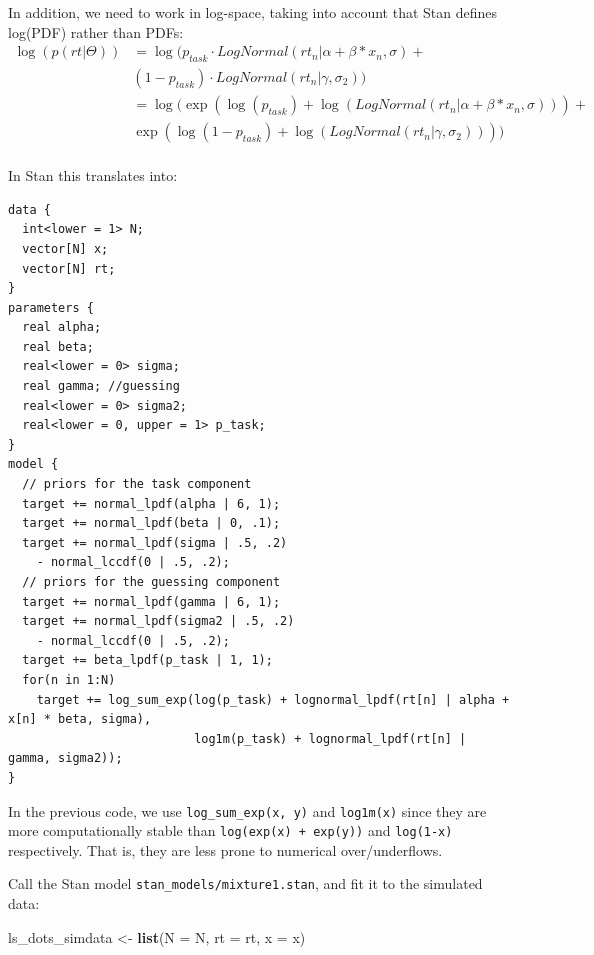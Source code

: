 \documentclass[12pt,]{krantz}
\newenvironment{Shaded}{\begin{snugshade}}{\end{snugshade}}
\newcommand{\DataTypeTok}[1]{\textcolor[rgb]{0.13,0.29,0.53}{#1}}
\newcommand{\KeywordTok}[1]{\textcolor[rgb]{0.13,0.29,0.53}{\textbf{#1}}}
\newcommand{\NormalTok}[1]{#1}
\newcommand{\StringTok}[1]{\textcolor[rgb]{0.31,0.60,0.02}{#1}}
\theoremstyle{definition}
\theoremstyle{definition}
\theoremstyle{definition}
\theoremstyle{remark}
\begin{document}
In addition, we need to work in log-space, taking into account that Stan defines log(PDF) rather than PDFs:
\begin{equation}
\begin{aligned}
\log(p(rt | \Theta)) &= \log(p_{task} \cdot LogNormal(rt_n | \alpha + \beta * x_n, \sigma) +\\ 
    & (1 - p_{task}) \cdot LogNormal(rt_n | \gamma, \sigma_2)) \\
&= \log( \exp( \log(p_{task}) +  \log(LogNormal(rt_n | \alpha + \beta * x_n, \sigma))) +\\ 
    & \exp( \log(1 - p_{task}) + \log(LogNormal(rt_n | \gamma, \sigma_2)))) \\
\end{aligned}
\end{equation}

In Stan this translates into:

\begin{verbatim}
data {
  int<lower = 1> N;
  vector[N] x;
  vector[N] rt;
}
parameters {
  real alpha;
  real beta;
  real<lower = 0> sigma;
  real gamma; //guessing
  real<lower = 0> sigma2;
  real<lower = 0, upper = 1> p_task;
}
model {
  // priors for the task component
  target += normal_lpdf(alpha | 6, 1);
  target += normal_lpdf(beta | 0, .1);
  target += normal_lpdf(sigma | .5, .2)
    - normal_lccdf(0 | .5, .2);
  // priors for the guessing component
  target += normal_lpdf(gamma | 6, 1);
  target += normal_lpdf(sigma2 | .5, .2)
    - normal_lccdf(0 | .5, .2);
  target += beta_lpdf(p_task | 1, 1);
  for(n in 1:N)
    target += log_sum_exp(log(p_task) + lognormal_lpdf(rt[n] | alpha + x[n] * beta, sigma),
                          log1m(p_task) + lognormal_lpdf(rt[n] | gamma, sigma2));
}
\end{verbatim}

In the previous code, we use \texttt{log\_sum\_exp(x,\ y)} and \texttt{log1m(x)} since they are more computationally stable than \texttt{log(exp(x)\ +\ exp(y))} and \texttt{log(1-x)} respectively. That is, they are less prone to numerical over/underflows.

Call the Stan model \texttt{stan\_models/mixture1.stan}, and fit it to the simulated data:

\begin{Shaded}
\begin{Highlighting}[]
\NormalTok{ls_dots_simdata <-}\StringTok{ }\KeywordTok{list}\NormalTok{(}\DataTypeTok{N =}\NormalTok{ N,}
                        \DataTypeTok{rt =}\NormalTok{ rt,}
                        \DataTypeTok{x =}\NormalTok{ x) }
\end{Highlighting}
\end{Shaded}
\end{document}
